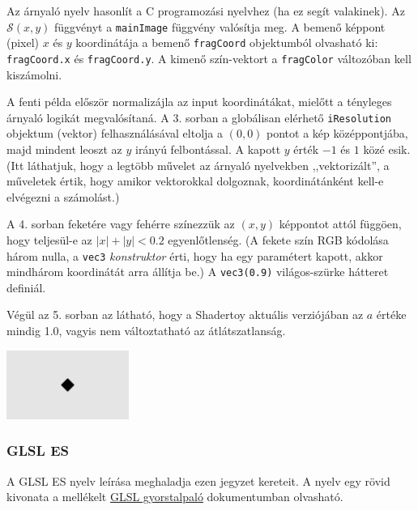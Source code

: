 Az árnyaló nyelv hasonlít a C programozási nyelvhez (ha ez segít valakinek). Az $\mathcal{S}(x,y)$
függvényt a \texttt{mainImage} függvény valósítja meg. A bemenő képpont (pixel) $x$ és $y$ koordinátája
a bemenő \texttt{fragCoord} objektumból olvasható ki: \texttt{fragCoord.x} és \texttt{fragCoord.y}.
A kimenő szín-vektort a \texttt{fragColor} változóban kell kiszámolni.


A fenti példa először normalizájla az input koordinátákat, mielőtt a tényleges árnyaló logikát megvalósítaná.
A 3. sorban a globálisan elérhető \texttt{iResolution} objektum (vektor) felhasználásával eltolja a $(0, 0)$ pontot
a kép középpontjába, majd mindent leoszt az $y$ irányú felbontással. A kapott $y$ érték $-1$ és $1$ közé esik.
(Itt láthatjuk, hogy a legtöbb művelet az árnyaló nyelvekben ,,vektorizált'', a műveletek értik, hogy amikor
vektorokkal dolgoznak, koordinátánként kell-e elvégezni a számolást.)

A 4. sorban feketére vagy fehérre színezzük az $(x, y)$ képpontot attól függöen, hogy teljesül-e
az $|x|+|y| < 0.2$ egyenlőtlenség.
(A fekete szín RGB kódolása három nulla, a \texttt{vec3} \emph{konstruktor}
érti, hogy ha egy paramétert kapott, akkor mindhárom koordinátát arra állítja be.)
A \texttt{vec3(0.9)} világos-szürke hátteret definiál.

Végül az 5. sorban az látható, hogy a Shadertoy aktuális verziójában az $a$ értéke mindig 1.0, vagyis
nem változtatható az átlátszatlanság.

\begin{center}
\includegraphics[width=4cm]{images/hello.png}
\end{center}

\subsubsection{GLSL ES}

A GLSL ES nyelv leírása meghaladja ezen jegyzet kereteit.
A nyelv egy rövid kivonata a mellékelt \href{run:./glsl.pdf}{GLSL gyorstalpaló}
dokumentumban olvasható.



